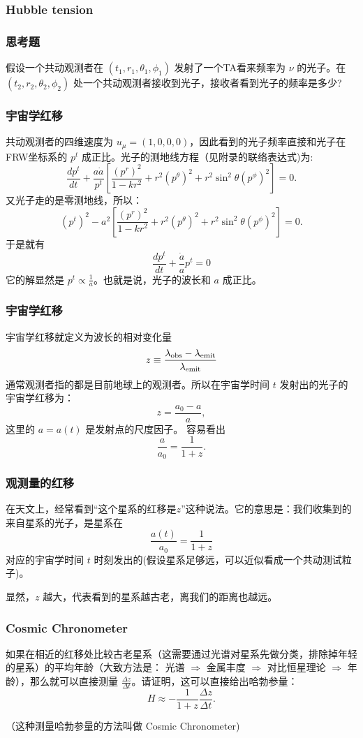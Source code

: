 \documentclass[CJK,13pt]{beamer}
\begin{document}
\begin{frame}
  \frametitle{Hubble tension}
\end{frame}

\begin{frame}
  \frametitle{思考题}
  
  假设一个共动观测者在 $(t_1, r_1, \theta_1,\phi_1)$ 发射了一个TA看来频率为 $\nu$ 的光子。在 $(t_2, r_2,\theta_2, \phi_2)$ 处一个共动观测者接收到光子，接收者看到光子的频率是多少?
\end{frame}


\begin{frame}
  \frametitle{宇宙学红移}
  共动观测者的四维速度为 $u_\mu = (1, 0, 0, 0)$，因此看到的光子频率直接和光子在FRW坐标系的 $p^t$ 成正比。光子的测地线方程（见附录的联络表达式)为:
  $$ \frac{dp^t}{dt} + \frac{a\dot a}{p^t} \left[\frac{(p^r)^2}{1-kr^2} + r^2\left(p^\theta\right)^2 + r^2\sin^2\theta \left(p^\phi\right)^2\right] = 0.$$
    又光子走的是零测地线，所以：
    $$\left(p^t\right)^2 - a^2\left[\frac{(p^r)^2}{1-kr^2} + r^2\left(p^\theta\right)^2 + r^2\sin^2\theta \left(p^\phi\right)^2 \right] = 0.$$
    于是就有
    $$\frac{d p^t}{dt}  + \frac{\dot a}{a } p^t = 0$$
    它的解显然是 $p^t \propto \frac{1}{a} $。也就是说，光子的波长和 $a$ 成正比。
\end{frame}


\begin{frame}
  \frametitle{宇宙学红移}
  宇宙学红移就定义为波长的相对变化量
  $$z \equiv \frac{\lambda_{\rm obs}-\lambda_{\rm emit}}{\lambda_{\rm emit}}$$
  通常观测者指的都是目前地球上的观测者。所以在宇宙学时间 $t$ 发射出的光子的宇宙学红移为：
  $$ z = \frac{a_0-a}{a}, $$
  这里的 $a=a(t)$ 是发射点的尺度因子。 容易看出
  $$  \frac{a}{a_0} = \frac{1}{1+z}.$$
\end{frame}


\begin{frame}
  \frametitle{观测量的红移}
  在天文上，经常看到“这个星系的红移是$z$”这种说法。它的意思是：我们收集到的来自星系的光子，是星系在
  $$ \frac{a(t)}{a_0} = \frac{1}{1+z}$$
  对应的宇宙学时间 $t$ 时刻发出的(假设星系足够远，可以近似看成一个共动测试粒子)。

  \skipline

  显然，$z$ 越大，代表看到的星系越古老，离我们的距离也越远。
\end{frame}


\begin{frame}
  \frametitle{Cosmic Chronometer}
  如果在相近的红移处比较古老星系（这需要通过光谱对星系先做分类，排除掉年轻的星系）的平均年龄（大致方法是： 光谱 $\Rightarrow$ 金属丰度 $\Rightarrow$ 对比恒星理论 $\Rightarrow$ 年龄），那么就可以直接测量 $\frac{\Delta z}{\Delta t}$。请证明，这可以直接给出哈勃参量：
  $$ H \approx -\frac{1}{1+z}\frac{\Delta z}{\Delta t}.$$

  （这种测量哈勃参量的方法叫做 Cosmic Chronometer)
\end{frame}
\end{document}

